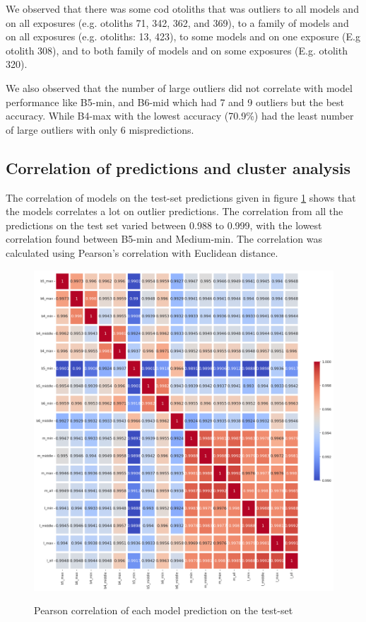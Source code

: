 \documentclass[10pt,letterpaper]{article}
\begin{document}
We observed that there was some cod otoliths that was outliers to all models and on all exposures (e.g. otoliths 71, 342, 362, and 369),
to a family of models and on all exposures (e.g. otoliths: 13, 423), 
to some models and on one exposure (E.g otolith 308), 
and to both family of models and on some exposures (E.g. otolith 320).

We also observed that the number of large outliers did not correlate with model performance like B5-min, and B6-mid which had 7 and 9 outliers but the best  accuracy. While B4-max with the lowest accuracy (70.9\%) had the least number of large outliers with only 6 mispredictions.

\subsection*{Correlation of predictions and cluster analysis}

The correlation of models on the test-set predictions given in figure \ref{marker9} shows that the models correlates a lot on outlier predictions. The correlation from all the predictions on the test set varied between 0.988 to 0.999, with the lowest correlation found between B5-min and Medium-min. The correlation was calculated using Pearson's correlation with Euclidean distance.

\begin{figure}[h!]
  \caption{Pearson correlation of each model prediction on the test-set}
  \centering
  \includegraphics[scale=0.40]{results/eda/pearson_corr_models2.png}
  \label{marker9}
\end{figure}
\end{document}
